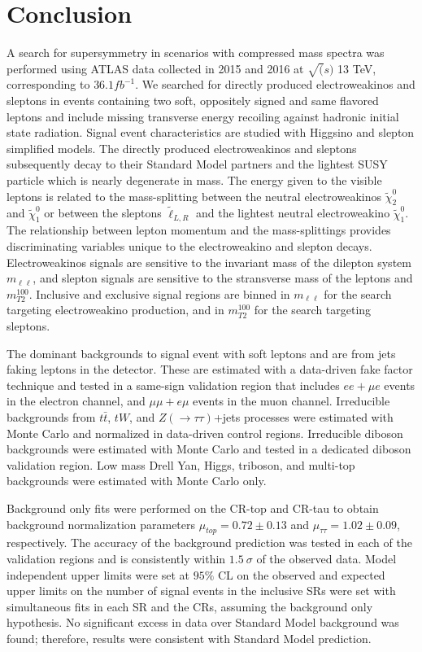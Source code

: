 \chapter{Conclusion}
\label{ch:conclusion}
A search for supersymmetry in scenarios with compressed mass spectra was performed using ATLAS data collected in 2015 and 2016 at $\sqrt(s)$ 13 TeV, corresponding to $36.1 fb^{-1}$. %
We searched for directly produced electroweakinos and sleptons in events containing two soft, oppositely signed and same flavored leptons and include missing transverse energy recoiling against hadronic initial state radiation.  Signal event characteristics are studied with Higgsino and slepton simplified models.  The directly produced electroweakinos and sleptons subsequently decay to their Standard Model partners and the lightest SUSY particle which is nearly degenerate in mass.  The energy given to the visible leptons is related to the mass-splitting between the neutral electroweakinos $\tilde\chi_2^0$ and $\tilde\chi_1^0$ or between the sleptons $\tilde\ell_{L,R}$ and the lightest neutral electroweakino $\tilde\chi_1^0$.  The relationship between lepton momentum and the mass-splittings provides discriminating variables unique to the electroweakino and slepton decays.  Electroweakinos signals are sensitive to the invariant mass of the dilepton system $m_{\ell\ell}$, and slepton signals are sensitive to the stransverse mass of the leptons and \met $m_{T2}^{100}$.  Inclusive and exclusive signal regions are binned in $m_{\ell\ell}$ for the search targeting electroweakino production, and in $m_{T2}^{100}$ for the search targeting sleptons.
 
The dominant backgrounds to signal event with soft leptons and \met are from jets faking leptons in the detector.  These are estimated with a data-driven fake factor technique and tested in a same-sign validation region that includes $ee+\mu e$ events in the electron channel, and $\mu\mu+e\mu$ events in the muon channel.  Irreducible backgrounds from $t\bar t$, $tW$, and $Z(\rightarrow\tau\tau)$+jets processes were estimated with Monte Carlo and normalized in data-driven control regions.  Irreducible diboson backgrounds were estimated with Monte Carlo and tested in a dedicated diboson validation region.  Low mass Drell Yan, Higgs, triboson, and multi-top backgrounds were estimated with Monte Carlo only.

Background only fits were performed on the CR-top and CR-tau to obtain background normalization parameters $\mu_{top} =0.72\pm0.13$ and $\mu_{\tau\tau}=1.02\pm0.09$, respectively.  The accuracy of the background prediction was tested in each of the validation regions and is consistently within $1.5~\sigma$ of the observed data.  Model independent upper limits were set at $95\%$ CL on the observed and expected upper limits on the number of signal events in the inclusive SRs were set with simultaneous fits in each SR and the CRs, assuming the background only hypothesis.  No significant excess in data over Standard Model background was found; therefore, results were consistent with Standard Model prediction. 

